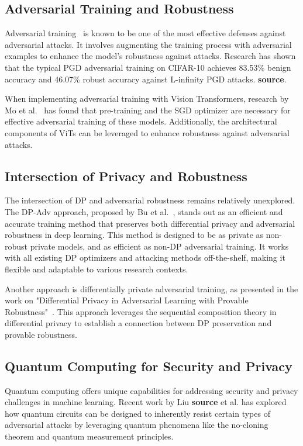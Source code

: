 \documentclass[11pt, conference]{IEEEtran}
\begin{document}
\subsection{Adversarial Training and Robustness}
Adversarial training~\cite{madry2018towards} is known to be one of the most effective defenses against adversarial attacks. It involves augmenting the training process with adversarial examples to enhance the model's robustness against attacks. Research has shown that the typical PGD adversarial training on CIFAR-10 achieves 83.53\% benign accuracy and 46.07\% robust accuracy against L-infinity PGD attacks. \textbf{source}.

When implementing adversarial training with Vision Transformers, research by Mo et al.~\cite{mo2022adversarial} has found that pre-training and the SGD optimizer are necessary for effective adversarial training of these models. Additionally, the architectural components of ViTs can be leveraged to enhance robustness against adversarial attacks.


\subsection{Intersection of Privacy and Robustness}
The intersection of DP and adversarial robustness remains relatively unexplored. The DP-Adv approach, proposed by Bu et al.~\cite{bu2021}, stands out as an efficient and accurate training method that preserves both differential privacy and adversarial robustness in deep learning. This method is designed to be as private as non-robust private models, and as efficient as non-DP adversarial training. It works with all existing DP optimizers and attacking methods off-the-shelf, making it flexible and adaptable to various research contexts.

Another approach is differentially private adversarial training, as presented in the work on "Differential Privacy in Adversarial Learning with Provable Robustness"~\cite{phan2019}. This approach leverages the sequential composition theory in differential privacy to establish a connection between DP preservation and provable robustness.

\subsection{Quantum Computing for Security and Privacy}
Quantum computing offers unique capabilities for addressing security and privacy challenges in machine learning. Recent work by Liu \textbf{source} et al. has explored how quantum circuits can be designed to inherently resist certain types of adversarial attacks by leveraging quantum phenomena like the no-cloning theorem and quantum measurement principles. 
\end{document}
